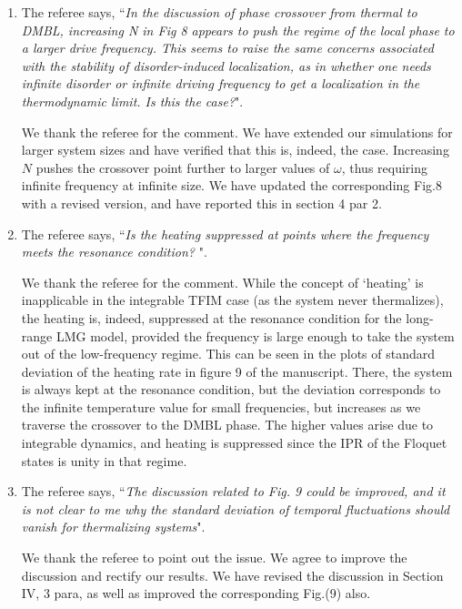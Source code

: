\documentclass[aps,prb,reprint,showpacs,floatfix,superscriptaddress, onecolumn, nofootinbib, 9pt]{revtex4-2}
\newcommand{\response}[1]{{\color{black}#1}} %
\newcommand{\comment}[1]{{\color{blue}#1}} %
\begin{document}
\begin{enumerate}
		\item The referee says, \comment{``\textit{In the discussion of phase crossover from thermal to DMBL, increasing N in Fig 8 appears to push the regime of the local phase to a larger drive frequency. This seems to raise the same concerns associated with the stability of disorder-induced localization, as in whether one needs infinite disorder or infinite driving frequency to get a localization in the thermodynamic limit. Is this the case?}"}.
		
		\response{    	
			We thank the referee for the comment. We have extended our simulations for larger system sizes and have verified that this is, indeed, the case. Increasing $N$ pushes the crossover point further to larger values of $\omega$, thus requiring infinite frequency at infinite size. We have updated the corresponding Fig.8 with a revised version, and have reported this in section 4 par 2.
		}
		\item The referee says, \comment{``\textit{Is the heating suppressed at points where the frequency meets the resonance condition? }"}.
		
		\response{
		We thank the referee for the comment. While the concept of `heating' is inapplicable in the integrable TFIM case (as the system never thermalizes), the heating is, indeed, suppressed at the resonance condition for the long-range LMG model, provided the frequency is large enough to take the system out of the low-frequency regime. This can be seen in the plots of standard deviation of the heating rate in figure 9 of the manuscript. There, the system is always kept at the resonance condition, but the deviation corresponds to the infinite temperature value for small frequencies, but increases as we traverse the crossover to the DMBL phase. The higher values arise due to integrable dynamics, and heating is suppressed since the IPR of the Floquet states is unity in that regime.}
		
		\item The referee says, \comment{``\textit{The discussion related to Fig. 9 could be improved, and it is not clear to me why the standard deviation of temporal fluctuations should vanish for thermalizing systems}"}.\\
		
		\response{ We thank the referee to point out the issue. We agree to improve the discussion and rectify our results. We have revised the discussion in Section IV, 3 para, as well as improved the corresponding Fig.(9) also.
			
}
\end{enumerate}
\end{document}
